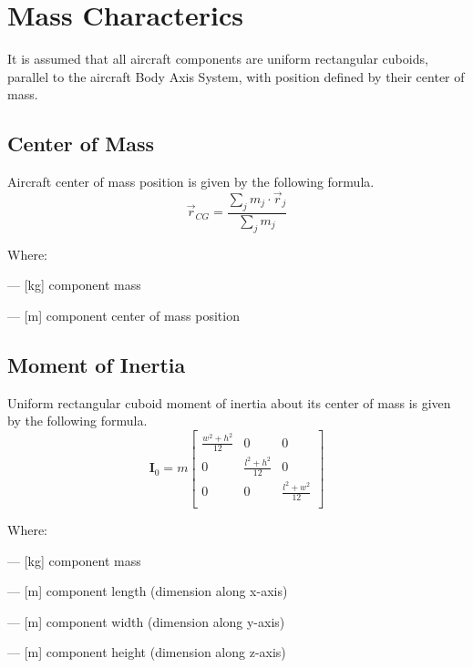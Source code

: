 \chapter{Mass Characterics}

It is assumed that all aircraft components are uniform rectangular cuboids, parallel to the aircraft Body Axis System, with position defined by their center of mass.


\section{Center of Mass}

Aircraft center of mass position is given by the following formula. \cite{Taylor2005}
\begin{equation}
  \label{eq-center-of-mass}
  \vec{r}_{CG}
  =
  \frac{\sum_{j} m_j \cdot \vec{r}_j}{\sum_{j} m_j}
\end{equation}

\noindent Where:
\begin{description}[align=right,labelwidth=1cm]
  \item [$m_j$]       --- [kg] component mass
  \item [$\vec{r}_j$] --- [m] component center of mass position
\end{description}

\section{Moment of Inertia}

Uniform rectangular cuboid moment of inertia about its center of mass is given by the following formula. \cite{Awrejcewicz2012}
\begin{equation}
  \label{eq-cuboid-inertia}
  {\boldsymbol I}_0
  =
  m
  \left[
    \begin{matrix}
      \frac{w^2 + h^2}{12} & 0 & 0 \\
      0 & \frac{l^2 + h^2}{12} & 0 \\
      0 & 0 & \frac{l^2 + w^2}{12} \\
    \end{matrix}
  \right]
\end{equation}

\noindent Where:
\begin{description}[align=right,labelwidth=1cm]
  \item [$m$] --- [kg] component mass
  \item [$l$] --- [m] component length (dimension along x-axis)
  \item [$w$] --- [m] component width (dimension along y-axis)
  \item [$h$] --- [m] component height (dimension along z-axis)
\end{description}

